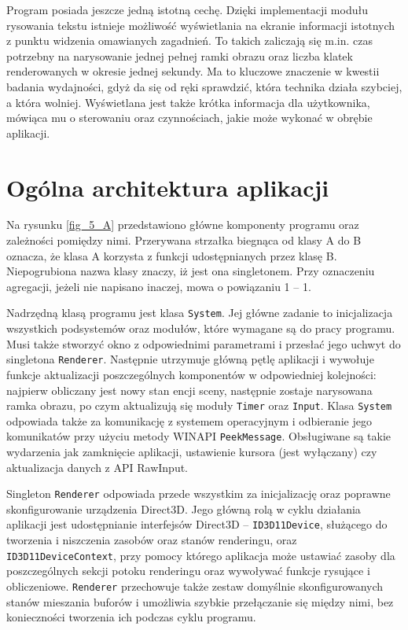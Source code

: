 	Program posiada jeszcze jedną istotną cechę. Dzięki implementacji modułu rysowania tekstu istnieje możliwość wyświetlania na ekranie informacji istotnych z punktu widzenia omawianych zagadnień. To takich zaliczają się m.in. czas potrzebny na narysowanie jednej pełnej ramki obrazu oraz liczba klatek renderowanych w okresie jednej sekundy. Ma to kluczowe znaczenie w kwestii badania wydajności, gdyż da się od ręki sprawdzić, która technika działa szybciej, a która wolniej. Wyświetlana jest także krótka informacja dla użytkownika, mówiąca mu o sterowaniu oraz czynnościach, jakie może wykonać w obrębie aplikacji.

	\section{Ogólna architektura aplikacji}
	\label{t:budowa:architektura}
	
	
	Na rysunku \ref{fig_5_A} przedstawiono główne komponenty programu oraz zależności pomiędzy nimi. Przerywana strzałka biegnąca od klasy A do B oznacza, że klasa A korzysta z funkcji udostępnianych przez klasę B. Niepogrubiona nazwa klasy znaczy, iż jest ona singletonem. Przy oznaczeniu agregacji, jeżeli nie napisano inaczej, mowa o powiązaniu 1 -- 1.
	
	
	Nadrzędną klasą programu jest klasa \texttt{System}. Jej główne zadanie to inicjalizacja wszystkich podsystemów oraz modułów, które wymagane są do pracy programu. Musi także stworzyć okno z odpowiednimi parametrami i przesłać jego uchwyt do singletona \texttt{Renderer}. Następnie utrzymuje główną pętlę aplikacji i wywołuje funkcje aktualizacji poszczególnych komponentów w odpowiedniej kolejności: najpierw obliczany jest nowy stan encji sceny, następnie zostaje narysowana ramka obrazu, po czym aktualizują się moduły \texttt{Timer} oraz \texttt{Input}. Klasa \texttt{System} odpowiada także za komunikację z systemem operacyjnym i odbieranie jego komunikatów przy użyciu metody WINAPI \texttt{PeekMessage}. Obsługiwane są takie wydarzenia jak zamknięcie aplikacji, ustawienie kursora (jest wyłączany) czy aktualizacja danych z API RawInput.
	
	Singleton \texttt{Renderer} odpowiada przede wszystkim za inicjalizację oraz poprawne skonfigurowanie urządzenia Direct3D. Jego główną rolą w cyklu działania aplikacji jest udostępnianie interfejsów Direct3D -- \texttt{ID3D11Device}, służącego do tworzenia i niszczenia zasobów oraz stanów renderingu, oraz \texttt{ID3D11DeviceContext}, przy pomocy którego aplikacja może ustawiać zasoby dla poszczególnych sekcji potoku renderingu oraz wywoływać funkcje rysujące i obliczeniowe. \texttt{Renderer} przechowuje także zestaw domyślnie skonfigurowanych stanów mieszania buforów i umożliwia szybkie przełączanie się między nimi, bez konieczności tworzenia ich podczas cyklu programu.
	
